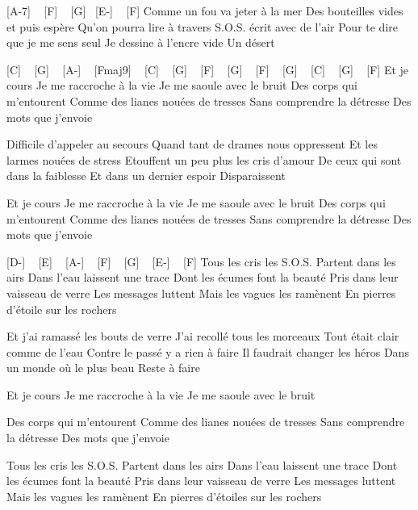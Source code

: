  [A-7]   ~ [F] ~ [G] ~[E-] ~ [F]
Comme un fou va jeter à la mer
Des bouteilles vides et puis espère
Qu'on pourra lire à travers
S.O.S. écrit avec de l'air
Pour te dire que je me sens seul
Je dessine à l'encre vide
Un désert


 [C] ~  [G] ~  [A-] ~   [Fmaj9] ~ [C] ~ 
[G] ~ [F] ~ [G] ~ [F] ~ [G] ~ [C] ~ [G] ~ [F]
Et je cours
Je me raccroche à la vie
Je me saoule avec le bruit
Des corps qui m'entourent
Comme des lianes nouées de tresses
Sans comprendre la détresse
Des mots que j'envoie


Difficile d'appeler au secours
Quand tant de drames nous oppressent
Et les larmes nouées de stress
Etouffent un peu plus les cris d'amour
De ceux qui sont dans la faiblesse
Et dans un dernier espoir
Disparaissent

Et je cours
Je me raccroche à la vie
Je me saoule avec le bruit
Des corps qui m'entourent
Comme des lianes nouées de tresses
Sans comprendre la détresse
Des mots que j'envoie

[D-] ~ [E] ~ [A-] ~ [F] ~ [G] ~ [E-] ~ [F]
Tous les cris les S.O.S.
Partent dans les airs
Dans l'eau laissent une trace
Dont les écumes font la beauté
Pris dans leur vaisseau de verre
Les messages luttent
Mais les vagues les ramènent
En pierres d'étoile sur les rochers

Et j'ai ramassé les bouts de verre
J'ai recollé tous les morceaux
Tout était clair comme de l'eau
Contre le passé y a rien à faire
Il faudrait changer les héros
Dans un monde où le plus beau
Reste à faire

Et je cours
Je me raccroche à la vie
Je me saoule avec le bruit

Des corps qui m'entourent
Comme des lianes nouées de tresses
Sans comprendre la détresse
Des mots que j'envoie

Tous les cris les S.O.S.
Partent dans les airs
Dans l'eau laissent une trace
Dont les écumes font la beauté
Pris dans leur vaisseau de verre
Les messages luttent
Mais les vagues les ramènent
En pierres d'étoiles sur les rochers 
